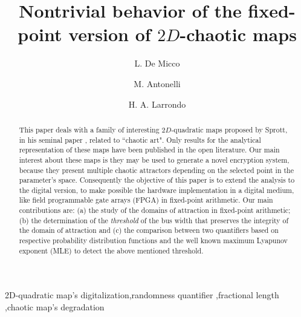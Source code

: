 \begin{frontmatter}


\title{Nontrivial behavior of the fixed-point version of $2D$-chaotic maps}

\author[mymainaddress,mysecondaryaddress]{L. De Micco}

\author[mymainaddress]{M. Antonelli}

\author[mymainaddress,mysecondaryaddress]{H. A. Larrondo}

\address[mymainaddress]{ICYTE (Instituto de Investigaciones Cient\'ificas y Tecnol\'ogicas en Electr\'onica)\\ Facultad de Ingenier\'ia, Universidad Nacional de Mar del Plata\\Juan B. Justo 4302, Mar del Plata\\Buenos Aires, Argentina.}
\address[mysecondaryaddress]{ CONICET (Consejo Nacional de Investigaciones Cient\'ificas y T\'ecnicas)}

\begin{abstract}
This paper deals with a family of interesting $2D$-quadratic maps
 proposed by Sprott, in his seminal paper \cite{Sprott1993},
related to ``chaotic art".  Only results for the analytical representation of these
maps have been published in the open literature. Our main interest about these maps is
they may be used to generate a novel encryption system, because
they present multiple chaotic attractors depending on the selected
point in the parameter's space. Consequently the objective of
this paper is to extend the analysis to the digital version, to make
possible  the hardware implementation in a digital medium, like field programmable gate arrays (FPGA) in fixed-point arithmetic.
Our main contributions are: (a) the study of the domains of attraction in fixed-point arithmetic; (b)  the determination of the \textsl{threshold} of the bus width that preserves the integrity of the domain of
attraction and (c) the comparison between two quantifiers based on respective probability distribution functions and  the well known maximum Lyapunov exponent (MLE) to detect the above mentioned threshold. 
\end{abstract}

\begin{keyword}
2D-quadratic map's digitalization\sep randomness quantifier \sep fractional length \sep chaotic map's degradation
\end{keyword}

\end{frontmatter}